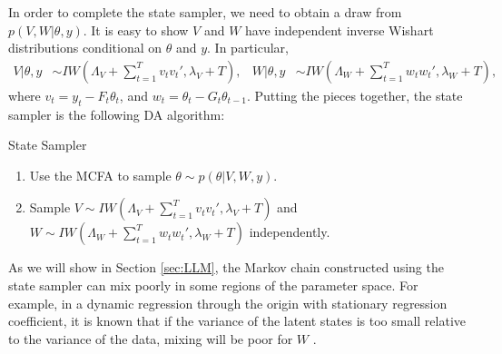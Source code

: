 \documentclass[12pt]{article}
\begin{document}
In order to complete the state sampler, we need to obtain a draw from $p(V,W|\theta,y)$. It is easy to show $V$ and $W$ have independent inverse Wishart distributions conditional on $\theta$ and $y$. In particular,
\begin{align*}
  V|\theta,y &\sim IW\left(\Lambda_V + \sum_{t=1}^Tv_tv_t',\lambda_V + T\right), &
  W|\theta,y &\sim IW\left(\Lambda_W + \sum_{t=1}^Tw_tw_t',\lambda_{W} + T\right), %
\end{align*}
where $v_t = y_t - F_t\theta_t$, and $w_t = \theta_t - G_t\theta_{t-1}$. Putting the pieces together, the state sampler is the following DA algorithm:
\begin{alg*}[State]State Sampler
\label{alg:DLMstate}
\begin{enumerate}
\item Use the MCFA to sample $\theta \sim p(\theta|V,W,y)$.
\item Sample $V \sim IW\left(\Lambda_V + \sum_{t=1}^Tv_tv_t',\lambda_V + T\right)$ and $W \sim IW\left(\Lambda_W + \sum_{t=1}^Tw_tw_t',\lambda_{W} + T\right)$ independently.
\end{enumerate}
\end{alg*}
\noindent As we will show in Section \ref{sec:LLM}, the Markov chain constructed using the state sampler can mix poorly in some regions of the parameter space. For example, in a dynamic regression through the origin with stationary regression coefficient, it is known that if the variance of the latent states is too small relative to the variance of the data, mixing will be poor for $W$ \cite{fruhwirth2004efficient}.
\end{document}
